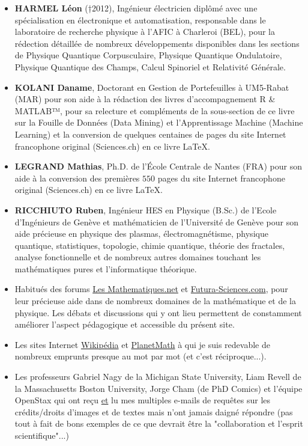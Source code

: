\documentclass[12pt,a4paper,twoside,openright]{report}
\theoremstyle{definition}
\theoremstyle{itexmp}
\numberwithin{equation}{section}
\begin{document}
	\begin{itemize}		
		\item \textbf{HARMEL Léon }(†2012), Ingénieur électricien diplômé avec une spécialisation en électronique et automatisation, responsable dans le laboratoire de recherche physique à l'AFIC à Charleroi (BEL), pour la rédection détaillée de nombreux développements disponibles dans les sections de Physique Quantique Corpusculaire, Physique Quantique Ondulatoire, Physique Quantique des Champs, Calcul Spinoriel et Relativité Générale.
		
		\item \textbf{KOLANI Daname}, Doctorant en Gestion de Portefeuilles à UM5-Rabat (MAR) pour son aide à la rédaction des livres d'accompagnement R \& MATLAB™, pour sa relecture et compléments de la sous-section de ce livre sur la Fouille de Données (Data Mining) et l'Apprentissage Machine (Machine Learning) et la conversion de quelques centaines de pages du site Internet francophone original (Sciences.ch) en ce livre \LaTeX.
		
		\item \textbf{LEGRAND Mathias}, Ph.D. de l'École Centrale de Nantes (FRA) pour son aide à la conversion des premières $550$ pages du site Internet francophone original (Sciences.ch) en ce livre \LaTeX.
				
		\item \textbf{RICCHIUTO Ruben}, Ingénieur HES en Physique (B.Sc.) de l'Ecole d'Ingénieurs de Genève et mathématicien de l'Université de Genève pour son aide précieuse en physique des plasmas, électromagnétisme, physique quantique, statistiques, topologie, chimie quantique, théorie des fractales, analyse fonctionnelle et de nombreux autres domaines touchant les mathématiques pures et l'informatique théorique.
		
		\item Habitués des forums \href{http://www.les-mathematiques.net}{{\color{blue} Les Mathematiques.net}} et \href{http://www.futura-sciences.com}{{\color{blue} Futura-Sciences.com}}, pour leur précieuse aide dans de nombreux domaines de la mathématique et de la physique. Les débats et discussions qui y ont lieu permettent de constamment améliorer l'aspect pédagogique et accessible du présent site.
		
		\item  Les sites Internet \href{http://www.wikipedia.com}{{\color{blue} Wikipédia}} et \href{http://www.planetmath.com}{{\color{blue} PlanetMath}} à qui je suis redevable de nombreux emprunts presque au mot par mot (et c'est réciproque...). 
		
		\item Les professeurs Gabriel Nagy de la Michigan State University, Liam Revell de la Massachusetts Boston University, Jorge Cham (de PhD Comics) et l'équipe OpenStax qui ont reçu \underline{et} lu mes multiples e-mails de requêtes sur les crédits/droits d'images et de textes mais n'ont jamais daigné répondre (pas tout à fait de bons exemples de ce que devrait être la "collaboration et l'esprit scientifique"...)
	\end{itemize}
	
\end{document}
